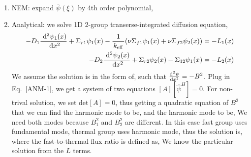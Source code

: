 \documentclass{school-22.211-notes}
\begin{document}
  \begin{enumerate}
    \item NEM: expand $\bar{\psi}(\xi)$ by 4th order polynomial, 

    \item Analytical: we solve 1D 2-group transerse-integrated diffusion equation, 
      \begin{align}
      -D_1 \frac{\mbox{ }\mathrm{d}^2 \psi_1(x)}{\mbox{ }\mathrm{d} x^2} + \Sigma_{r1} \psi_1(x) - \frac{1}{\left. k_{\mathrm{eff}} \right.} (\nu \Sigma_{f1} \psi_1 (x) + \nu \Sigma_{f2} \psi_2 (x) ) &= - L_1(x) \notag \\
      -D_2 \frac{\mbox{ }\mathrm{d}^2 \psi_2(x)}{\mbox{ }\mathrm{d} x^2} + \Sigma_{r2} \psi_2(x) - \Sigma_{12} \psi_1 (x) &= - L_2 (x)  \label{ANM-1}
    \end{align}
      We assume the solution is in the form of, 
      such that $\frac{\mathrm{d}^{2}\psi}{\mathrm{d}x^{2}} = - B^2$. Plug in Eq.~\ref{ANM-1}, we get a system of two equations $[A] [\hat{\psi}^H] = 0$. For non-trival solution, we set det$[A] = 0$, thus getting a quadratic equation of $B^2$ that we can find the harmonic mode to be, 
      and the harmonic mode to be, 
      We need both modes because $B_1^2$ and $B_2^2$ are different. In this case fast group uses fundamental mode, thermal group uses harmonic mode, thus the solution is, 
     where the fast-to-thermal flux ratio is defined as,
     We know the particular solution from the $L$ terms. 


\end{enumerate}
\end{document}
